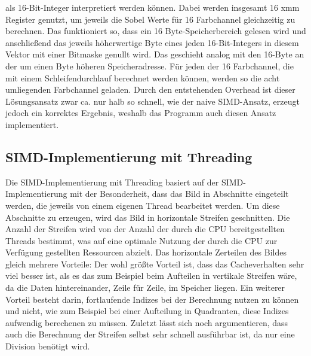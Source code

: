 \documentclass[course=erap]{aspdoc}
\begin{document}
als 16-Bit-Integer interpretiert werden können.
Dabei werden insgesamt 16 xmm Register genutzt, um jeweils die Sobel Werte für 16 Farbchannel gleichzeitig zu berechnen.
Das funktioniert so, dass ein 16 Byte-Speicherbereich gelesen wird und anschließend das jeweils höherwertige Byte eines jeden
16-Bit-Integers in diesem Vektor mit einer Bitmaske genullt wird.
Das geschieht analog mit den 16-Byte an der um einen Byte höheren Speicheradresse.
Für jeden der 16 Farbchannel, die mit einem Schleifendurchlauf berechnet werden können, werden so die acht umliegenden Farbchannel geladen.
Durch den entstehenden Overhead ist dieser Lösungsansatz zwar ca. nur halb so schnell, wie der naive SIMD-Ansatz, erzeugt jedoch ein korrektes Ergebnis, weshalb das Programm auch diesen Ansatz implementiert.

\subsection{SIMD-Implementierung mit Threading}
\label{sec:simd-threading}
Die SIMD-Implementierung mit Threading basiert auf der SIMD-Implementierung mit der Besonderheit, dass das Bild in Abschnitte eingeteilt werden, die jeweils von einem eigenen Thread bearbeitet werden.
Um diese Abschnitte zu erzeugen, wird das Bild in horizontale Streifen geschnitten.
Die Anzahl der Streifen wird von der Anzahl der durch die CPU bereitgestellten Threads bestimmt, was auf eine optimale Nutzung der durch die CPU zur Verfügung gestellten Ressourcen abzielt.
Das horizontale Zerteilen des Bildes gleich mehrere Vorteile:
Der wohl größte Vorteil ist, dass das Cacheverhalten sehr viel besser ist, als es das zum Beispiel beim Aufteilen in vertikale Streifen wäre, da die Daten hintereinander, Zeile für Zeile, im Speicher liegen.
Ein weiterer Vorteil besteht darin, fortlaufende Indizes bei der Berechnung nutzen zu können und nicht, wie zum Beispiel bei einer Aufteilung in Quadranten, diese Indizes aufwendig berechenen zu müssen.
Zuletzt lässt sich noch argumentieren, dass auch die Berechnung der Streifen selbst sehr schnell ausführbar ist, da nur eine Division benötigt wird.
\end{document}
